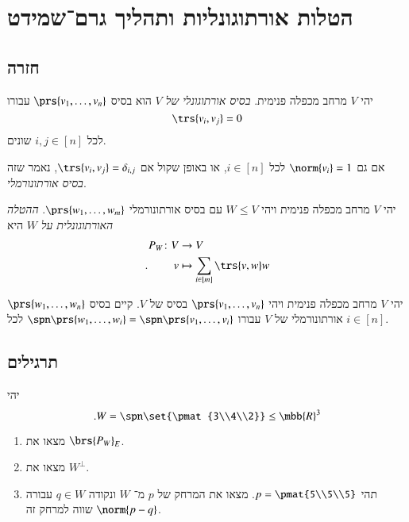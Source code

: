 \documentclass[a4paper,10pt,oneside,openany]{article}
\begin{document}
\section{הטלות אורתוגונליות ותהליך גרם־שמידט}

\subsection{חזרה}

\begin{definition}
יהי
$V$
מרחב מכפלה פנימית.
\emph{בסיס אורתוגונלי של
$V$}
הוא בסיס
$\prs{v_1, \ldots, v_n}$
עבורו
\[\trs{v_i, v_j} = 0\]
לכל
$i,j \in [n]$
שונים.

אם גם
$\norm{v_i} = 1$
לכל
$i \in [n]$,
או באופן שקול אם
$\trs{v_i, v_j} = \delta_{i,j}$,
נאמר שזה
\emph{בסיס אורתונורמלי}.
\end{definition}

\begin{definition}
יהי
$V$
מרחב מכפלה פנימית ויהי
$W \leq V$
עם בסיס אורתונורמלי
$\prs{w_1, \ldots, w_m}$.
\emph{ההטלה האורתוגונלית על
$W$}
היא
\begin{align*}
P_W \colon V &\to V \\
\text{.} \hphantom{lalala} v &\mapsto \sum_{i \in [m]} \trs{v, w} w
\end{align*}
\end{definition}

\begin{theorem}
יהי
$V$
מרחב מכפלה פנימית ויהי
$\prs{v_1, \ldots, v_n}$
בסיס של
$V$.
קיים בסיס
$\prs{w_1, \ldots, w_n}$
אורתונורמלי
של
$V$
עבורו
$\spn\prs{w_1, \ldots, w_i} = \spn\prs{v_1, \ldots, v_i}$
לכל
$i \in [n]$.
\end{theorem}

\subsection{תרגילים}

\begin{exercise}
יהי
\[\text{.} W = \spn\set{\pmat{3\\4\\2}} \leq \mbb{R}^3\]

\begin{enumerate}
\item מצאו את 
$\brs{P_W}_E$.
\item מצאו את
$W^\perp$.
\item תהי
$p = \pmat{5\\5\\5}$.
מצאו את המרחק של
$p$
מ־%
$W$
ונקודה
$q \in W$
עבורה
$\norm{p-q}$
שווה למרחק זה.
\end{enumerate}
\end{exercise}
\end{document}
